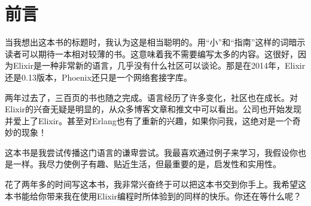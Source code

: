 \chapter*{前言}\label{preface}

当我想出这本书的标题时，我认为这是相当聪明的。用``小''和``指南''这样的词暗示读者可以期待一本相对较薄的书。这意味着我不需要编写太多的内容。这很好，因为Elixir是一种非常新的语言，几乎没有什么社区可以谈论。那是在2014年，Elixir还是0.13版本，Phoenix还只是一个网络套接字库。

两年过去了，三百页的书也随之完成。语言经历了许多变化，社区也在成长。对Elixir的兴奋无疑是明显的，从众多博客文章和推文中可以看出。公司也开始发现并爱上了Elixir。甚至对Erlang也有了重新的兴趣，如果你问我，这绝对是一个奇妙的现象！

这本书是我尝试传播这门语言的谦卑尝试。我最喜欢通过例子来学习，我假设你也是一样。我尽力使例子有趣、贴近生活，但最重要的是，启发性和实用性。

花了两年多的时间写这本书，我非常兴奋终于可以把这本书交到你手上。我希望这本书能给你带来我在使用Elixir编程时所体验到的同样的快乐。你还在等什么呢？
